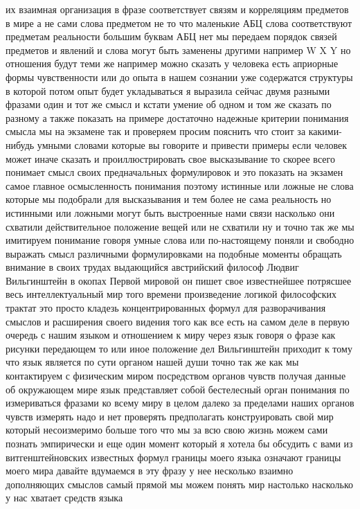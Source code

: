 их взаимная организация в фразе соответствует связям и корреляциям предметов в
мире а не сами слова предметом не то что маленькие АБЦ слова соответствуют
предметам реальности большим буквам АБЦ нет мы передаем порядок связей предметов
и явлений и слова могут быть заменены другими например W X Y но отношения будут
теми же например можно сказать у человека есть априорные формы чувственности или
до опыта в нашем сознании уже содержатся структуры в которой потом опыт будет
укладываться я выразила сейчас двумя разными фразами один и тот же смысл и
кстати умение об одном и том же сказать по разному а также показать на примере
достаточно надежные критерии понимания смысла мы на экзамене так и проверяем
просим пояснить что стоит за какими-нибудь умными словами которые вы говорите и
привести примеры если человек может иначе сказать и проиллюстрировать свое
высказывание то скорее всего понимает смысл своих предначальных формулировок и
это показать на экзамен самое главное осмысленность понимания поэтому истинные
или ложные не слова которые мы подобрали для высказывания и тем более не сама
реальность но истинными или ложными могут быть выстроенные нами связи насколько
они схватили действительное положение вещей или не схватили ну и точно так же мы
имитируем понимание говоря умные слова или по-настоящему поняли и свободно
выражать смысл различными формулировками на подобные моменты обращать внимание в
своих трудах выдающийся австрийский философ Людвиг Вильгинштейн в окопах Первой
мировой он пишет свое известнейшее потрясшее весь интеллектуальный мир того
времени произведение логикой философских трактат это просто кладезь
концентрированных формул для разворачивания смыслов и расширения своего видения
того как все есть на самом деле в первую очередь с нашим языком и отношением к
миру через язык говоря о фразе как рисунки передающем то или иное положение дел
Вильгинштейн приходит к тому что язык является по сути органом нашей души точно
так же как мы контактируем с физическим миром посредством органов чувств получая
данные об окружающем мире язык представляет собой бестелесный орган понимания по
измериваться фразами ко всему миру в целом далеко за пределами наших органов
чувств измерять надо и нет проверять предполагать конструировать свой мир
который несоизмеримо больше того что мы за всю свою жизнь можем сами познать
эмпирически и еще один момент который я хотела бы обсудить с вами из
витгенштейновских известных формул границы моего языка означают границы моего
мира давайте вдумаемся в эту фразу у нее несколько взаимно дополняющих смыслов
самый прямой мы можем понять мир настолько насколько у нас хватает средств языка
